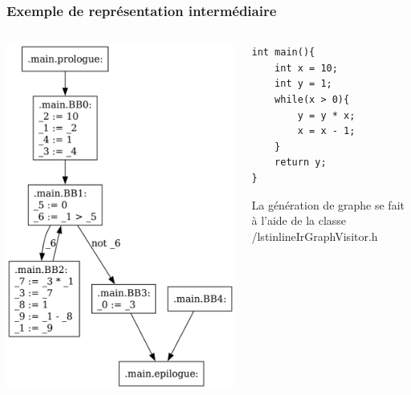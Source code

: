 \documentclass{beamer}
\begin{document}
\begin{frame}[fragile]
    \frametitle{Exemple de représentation intermédiaire}

    \begin{columns}
        \begin{column}{.5\textwidth}
            \begin{center}
                \includegraphics[width=\textwidth,height=0.8\textheight,keepaspectratio]{graphs/fact_no_opti.dot.png}
            \end{center}
        \end{column}
        \begin{column}{.5\textwidth}
            \begin{lstlisting}
int main(){
    int x = 10;
    int y = 1;
    while(x > 0){
        y = y * x;
        x = x - 1;
    }
    return y;
}
            \end{lstlisting}
            La génération de graphe se fait à l'aide de la classe /lstinline{IrGraphVisitor.h}
        \end{column}
    \end{columns}

\end{frame}
\end{document}
